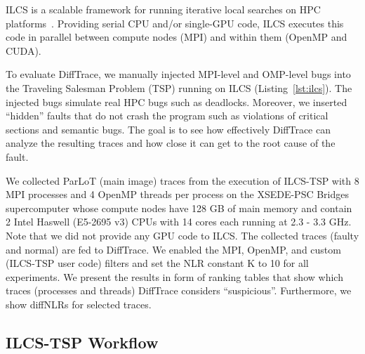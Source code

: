 ILCS is a scalable framework for running iterative local searches on HPC platforms~\cite{ilcs}.
%
Providing serial CPU and/or single-GPU code, ILCS executes this code in parallel between compute nodes (MPI) and within them (OpenMP and CUDA).
%

To evaluate DiffTrace, we manually injected MPI-level and OMP-level bugs into the Traveling Salesman Problem (TSP) running on ILCS (Listing~\ref{lst:ilcs}).
%
The injected bugs simulate real HPC bugs such as deadlocks.
%
%
Moreover, we inserted ``hidden'' faults that do not crash the program such as violations of critical sections and semantic bugs. 
%
%
The goal is to see how effectively DiffTrace can analyze the resulting traces and how close it can get to the root cause of the fault.
%


%
We collected ParLoT (main image) traces from the execution of ILCS-TSP with 8 MPI processes and 4 OpenMP threads per process on the XSEDE-PSC Bridges supercomputer whose compute nodes have 128 GB of main memory and contain 2 Intel Haswell (E5-2695 v3) CPUs with 14 cores each running at 2.3 - 3.3 GHz.
%
Note that we did not provide any GPU code to ILCS.
%
The collected traces (faulty and normal) are fed to DiffTrace. We enabled the MPI, OpenMP, and custom (ILCS-TSP user code) filters and set the NLR constant K to 10 for all experiments.
%
We present the results in form of ranking tables that show which traces (processes and threads) DiffTrace considers ``suspicious''. Furthermore, we show diffNLRs for selected traces.



\subsection{ILCS-TSP Workflow}

